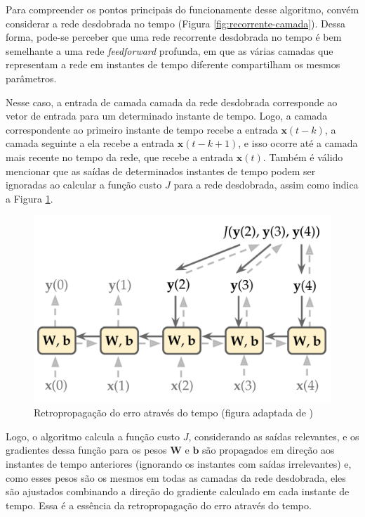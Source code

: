 \documentclass[a4paper, 12pt]{article}
\begin{document}
Para compreender os pontos principais do funcionamente desse algoritmo, convém considerar a rede desdobrada no tempo (Figura \ref{fig:recorrente-camada}). Dessa forma, pode-se perceber que uma rede recorrente desdobrada no tempo é bem semelhante a uma rede \textit{feedforward} profunda, em que as várias camadas que representam a rede em instantes de tempo diferente compartilham os mesmos parâmetros.

Nesse caso, a entrada de camada camada da rede desdobrada corresponde ao vetor de entrada para um determinado instante de tempo. Logo, a camada correspondente ao primeiro instante de tempo recebe a entrada $\mathbf{x}(t-k)$, a camada seguinte a ela recebe a entrada $\mathbf{x}(t-k+1)$, e isso ocorre até a camada mais recente no tempo da rede, que recebe a entrada $\mathbf{x}(t)$. Também é válido mencionar que as saídas de determinados instantes de tempo podem ser ignoradas ao calcular a função custo $J$ para a rede desdobrada, assim como indica a Figura \ref{fig:rnn-backpropagation}.
\begin{figure}[!ht]
\centering
\includegraphics[scale = 0.3]{rnn-backpropagation.pdf}
\caption{Retropropagação do erro através do tempo (figura adaptada de \cite{geron2019hands})}
\label{fig:rnn-backpropagation}
\end{figure}

Logo, o algoritmo calcula a função custo $J$, considerando as saídas relevantes, e os gradientes dessa função para os pesos $\mathbf{W}$ e $\mathbf{b}$ são propagados em direção aos instantes de tempo anteriores (ignorando os instantes com saídas irrelevantes) e, como esses pesos são os mesmos em todas as camadas da rede desdobrada, eles são ajustados combinando a direção do gradiente calculado em cada instante de tempo. Essa é a essência da retropropagação do erro através do tempo.
\end{document}
